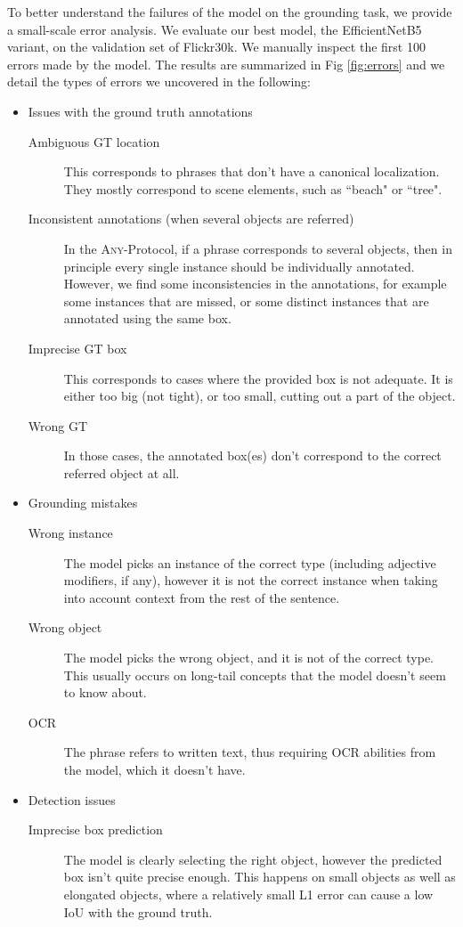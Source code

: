 To better understand the failures of the model on the grounding task, we provide a small-scale error analysis. We evaluate our best model, the EfficientNetB5 variant, on the validation set of Flickr30k. We manually inspect the first 100 errors made by the model. The results are summarized in Fig \ref{fig:errors} and we detail the types of errors we uncovered in the following:
\begin{itemize}
    \item Issues with the ground truth annotations
    \begin{description}
\item [Ambiguous GT location] This corresponds to phrases that don't have a canonical localization. They mostly correspond to scene elements, such as ``beach" or ``tree".
\item [Inconsistent annotations (when several objects are referred)] In the \textsc{Any}-Protocol, if a phrase corresponds to several objects, then in principle every single instance should be individually annotated. However, we find some inconsistencies in the annotations, for example some instances that are missed, or some distinct instances that are annotated using the same box.
\item [Imprecise GT box] This corresponds to cases where the provided box is not adequate. It is either too big (not tight), or too small, cutting out a part of the object.
\item[Wrong GT] In those cases, the annotated box(es) don't correspond to the correct referred object at all.
\end{description}
\item Grounding mistakes
    \begin{description}
\item [Wrong instance] The model picks an instance of the correct type (including adjective modifiers, if any), however it is not the correct instance when taking into account context from the rest of the sentence. 
\item[Wrong object] The model picks the wrong object, and it is not of the correct type. This usually occurs on long-tail concepts that the model doesn't seem to know about.
\item[OCR] The phrase refers to written text, thus requiring OCR abilities from the model, which it doesn't have.
\end{description}
\item Detection issues
    \begin{description}
\item [Imprecise box prediction] The model is clearly selecting the right object, however the predicted box isn't quite precise enough. This happens on small objects as well as elongated objects, where a relatively small L1 error can cause a low IoU with the ground truth.

\end{description}
\end{itemize}

